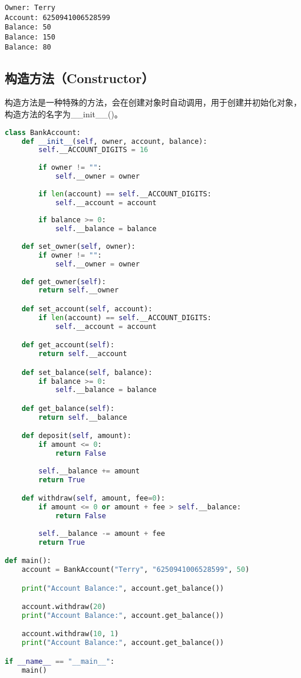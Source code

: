 \begin{tcolorbox}
    \begin{verbatim}
Owner: Terry
Account: 6250941006528599
Balance: 50
Balance: 150
Balance: 80
\end{verbatim}
\end{tcolorbox}

\vspace{0.5cm}

\subsection{构造方法（Constructor）}

构造方法是一种特殊的方法，会在创建对象时自动调用，用于创建并初始化对象，构造方法的名字为\_\_init\_\_()。\\


\begin{lstlisting}[language=Python]
class BankAccount:
    def __init__(self, owner, account, balance):
        self.__ACCOUNT_DIGITS = 16
        
        if owner != "":
            self.__owner = owner
        
        if len(account) == self.__ACCOUNT_DIGITS:
            self.__account = account
        
        if balance >= 0:
            self.__balance = balance
    
    def set_owner(self, owner):
        if owner != "":
            self.__owner = owner
    
    def get_owner(self):
        return self.__owner

    def set_account(self, account):
        if len(account) == self.__ACCOUNT_DIGITS:
            self.__account = account

    def get_account(self):
        return self.__account

    def set_balance(self, balance):
        if balance >= 0:
            self.__balance = balance

    def get_balance(self):
        return self.__balance

    def deposit(self, amount):
        if amount <= 0:
            return False
        
        self.__balance += amount
        return True

    def withdraw(self, amount, fee=0):
        if amount <= 0 or amount + fee > self.__balance:
            return False
        
        self.__balance -= amount + fee
        return True

def main():
    account = BankAccount("Terry", "6250941006528599", 50)

    print("Account Balance:", account.get_balance())

    account.withdraw(20)
    print("Account Balance:", account.get_balance())

    account.withdraw(10, 1)
    print("Account Balance:", account.get_balance())

if __name__ == "__main__":
    main()
\end{lstlisting}

